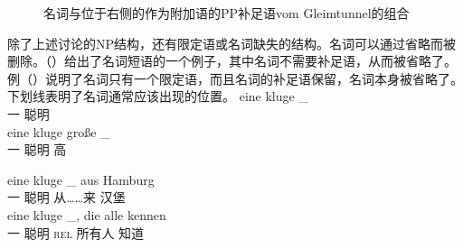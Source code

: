 \begin{figure}
\caption{\label{Abbildung-NP-mit-PP-Argument}名词与位于右侧的作为附加语的PP补足语vom Gleimtunnel的组合}
\end{figure}%

除了上述讨论的NP结构，还有限定语或名词缺失的结构。名词可以通过省略而被删除。（）给出了名词短语的一个例子，其中名词不需要补足语，从而被省略了。例（）说明了名词只有一个限定语，而且名词的补足语保留，名词本身被省略了。下划线表明了名词通常应该出现的位置。
\eal
\label{ex-nounless-np}
\ex 
\gll eine kluge \_\\
	 一 聪明\\
\ex 
\gll eine kluge große \_\\
     一    聪明 高\\

\ex 
\gll eine kluge \_ aus Hamburg\\
	 一 聪明 {} 从……来 汉堡\\
\ex 
\gll eine kluge \_, die alle kennen\\
	 一 聪明 {} \textsc{rel} 所有人 知道\\
\zl

